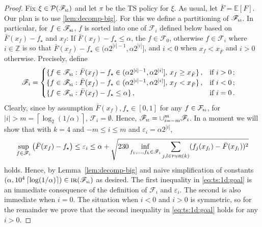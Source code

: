\documentclass[letter, 12pt]{report}
\newcommand{\pb}{\text{\tiny\texttt{b}}}
\newcommand{\pl}{\text{\tiny\texttt{l}}}
\newcommand{\ceil}[1]{\left\lceil #1 \right\rceil}
\newcommand{\pair}{\operatorname{\textsc{pair}}}
\newcommand{\E}{\mathbb E}
\newcommand{\cF}{\mathcal F}
\newcommand{\sF}{\mathscr F}
\newcommand{\cP}{\mathcal P}
\newcommand{\1}{\mathbf{1}}
\newcommand{\IR}{\operatorname{\textsc{ir}}}
\newcommand{\ts}{\textsc{TS}\xspace}
\renewcommand{\epsilon}{\varepsilon}
\theoremstyle{plain}
\theoremstyle{definition}
\theoremstyle{remark}
\begin{document}
\begin{proof}
    Fix $\xi \in \cP(\sF_{\pb\pl})$ and let $\pi$ be the \ts{} policy for $\xi$.
    As usual, let $\bar{F} = \E[F]$.
    Our plan is to use \cref{lem:decomp-big}.
    For this we define a partitioning of $\sF_{\pb\pl}$.
    In particular, for $f \in \sF_{\pb\pl}$,
    $f$ is sorted into one of $\sF_i$ defined below based
    on $\bar{F}(x_f) - f_\star$ and $x_f$:
    If $\bar{F}(x_f) - f_\star \leq \alpha$, the $f \in \sF_0$,
    otherwise $f \in \sF_i$ where $i \in \mathbb{Z}$ is so that $\bar{F}(x_f) - f_\star \in (\alpha 2^{|i|-1}, \alpha 2^{|i|}]$, and $i <0$ when $x_f < x_{\bar F}$ and $i>0$ otherwise.
    Precisely, define
    \begin{align}
        \sF_i & = \begin{cases}
                      \{f \in \sF_{\pb\pl} : \bar F(x_f) - f_\star \in (\alpha 2^{|i|-1}, \alpha 2^{|i|}],\, x_f \geq x_{\bar F}\}\,, & \text{if } i > 0\,;  \\
                      \{f \in \sF_{\pb\pl} : \bar F(x_f) - f_\star \in (\alpha 2^{|i|-1}, \alpha 2^{|i|}],\, x_f < x_{\bar F}\}\,,    & \text{if } i < 0\,;  \\
                      \{f \in \sF_{\pb\pl} : \bar F(x_f) - f_\star \leq \alpha \}\,,                                                  & \text{if } i = 0 \,.
                  \end{cases}
    \end{align}
    Clearly, since by assumption $\bar{F}(x_f), f_\star \in [0,1]$ for any $f \in \cF_{\pb\pl}$,
    for $|i| > m = \ceil{\log_2(1/\alpha)}$, $\sF_i = \emptyset$. Hence, $\sF_{\pb\pl} = \cup_{i=-m}^m \sF_i$.
    In a moment we will show that with $k = 4$ and $-m \leq i \leq m$ and $\epsilon_i = \alpha 2^{|i|}$,
    \begin{align}
        \sup_{f \in \sF_i} \left(\bar F(x_f) - f_\star\right)
        \leq \epsilon_i \leq \alpha
        + \sqrt{230\inf_{f_1,\ldots,f_k \in \sF_i} \sum_{j,l \in \pair(k)} (f_j(x_{f_l}) - \bar F(x_{f_l}))^2}
        \label{eq:ts:1d:goal}
    \end{align}
    holds.
    Hence, by Lemma~\ref{lem:decomp-big} and naive simplification of constants $(\alpha, 10^4 \ceil{\log(1/\alpha)}) \in \IR(\sF_{\pb\pl})$ as desired.
    The first inequality in \cref{eq:ts:1d:goal} is an immediate consequence of the definition of $\sF_i$ and $\epsilon_i$.
    The second is also immediate when $i = 0$.
    The situation when $i < 0$ and $i > 0$ is symmetric, so for the remainder we prove that the second inequality in \cref{eq:ts:1d:goal} holds for any $i > 0$.

\end{proof}
\end{document}
